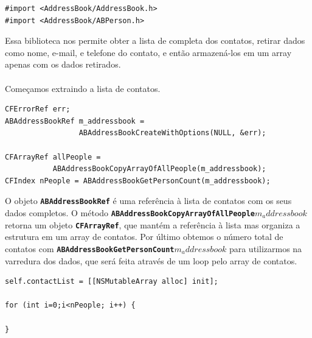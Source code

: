 \documentclass[a4paper,12pt,brazil,doubleside]{book}
\begin{document}
\begin{listing}
\begin{verbatim}
#import <AddressBook/AddressBook.h>
#import <AddressBook/ABPerson.h>
\end{verbatim}
\end{listing}

Essa biblioteca nos permite obter a lista de completa dos contatos, retirar dados como nome, e-mail, e telefone do contato, e então armazená-los em um array apenas com os dados retirados.
\paragraph{}Começamos extraindo a lista de contatos.

\begin{listing}
\begin{verbatim}
CFErrorRef err;
ABAddressBookRef m_addressbook =
                 ABAddressBookCreateWithOptions(NULL, &err);
    
CFArrayRef allPeople =
           ABAddressBookCopyArrayOfAllPeople(m_addressbook);
CFIndex nPeople = ABAddressBookGetPersonCount(m_addressbook);
\end{verbatim}
\end{listing}

O objeto \texttt{\textbf{ABAddressBookRef}} é uma referência à lista de contatos com os seus dados completos. O método \texttt{\textbf{ABAddressBookCopyArrayOfAllPeople\(m_addressbook\)}} retorna um objeto \texttt{\textbf{CFArrayRef}}, que mantém a referência à lista mas organiza a estrutura em um array de contatos. Por último obtemos o número total de contatos com \texttt{\textbf{ABAddressBookGetPersonCount\(m_addressbook\)}} para utilizarmos na varredura dos dados, que será feita através de um loop pelo array de contatos.

\pagebreak

\begin{listing}
\begin{verbatim}
self.contactList = [[NSMutableArray alloc] init];

for (int i=0;i<nPeople; i++) {
    
}
\end{verbatim}
\end{listing}
\end{document}
